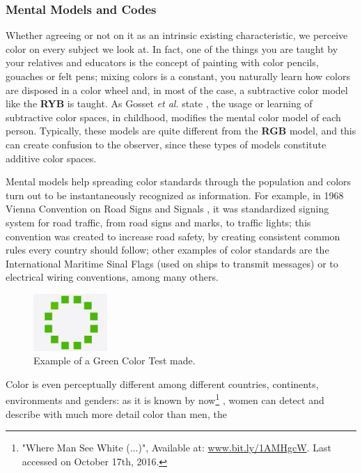 \subsubsection{Mental Models and Codes}
Whether agreeing or not on it as an intrinsic existing characteristic, we perceive color on every
subject we look at. In fact, one of the things you are taught by your relatives and educators is the concept of
painting with color pencils, gouaches or felt pens; mixing colors is a constant,
you naturally learn how colors are disposed in a color wheel and, in most of the case, a subtractive color
model like the \textbf{RYB} is taught. As Gosset \emph{et al.} state \cite{Gossett2004}, the usage or learning of
subtractive color spaces, in childhood, modifies the mental color model of each person. Typically, these models are quite
different from the \textbf{RGB} model, and this can create confusion to
the observer, since these types of models constitute additive color spaces. \par
Mental models help spreading color standards through the population and colors turn out to be instantaneously
recognized as information. For example, in 1968 Vienna Convention on Road Signs and Signals \cite{Nations1995}, it was standardized signing system for road traffic, from road signs and marks, to traffic lights;
this convention was created to increase road safety, by creating consistent common rules every country
should follow; other examples of color standards are the International Maritime Sinal Flags
\cite{Agency2003} (used on ships to transmit messages) or to electrical wiring conventions, among many others. \par
%
\begin{figure}
	\centering
    \vspace{-10pt}
    \includegraphics[width=0.25\textwidth]{images/background/Himba_green-color-ring.jpg}
    \caption[Himba Test: Green Color Ring]{Example of a Green Color Test made.\protect\footnotemark[8]}
    \label{fig:himba}
\end{figure}
%
Color is even perceptually different among different countries, continents, environments and genders:
as it is known by now\footnote{"Where Man See White (...)", Available at:
\url{www.bit.ly/1AMHgcW}.
Last accessed on October 17th, 2016.} \cite{Ginter2011}, women can detect and describe with much more detail color than men, the
